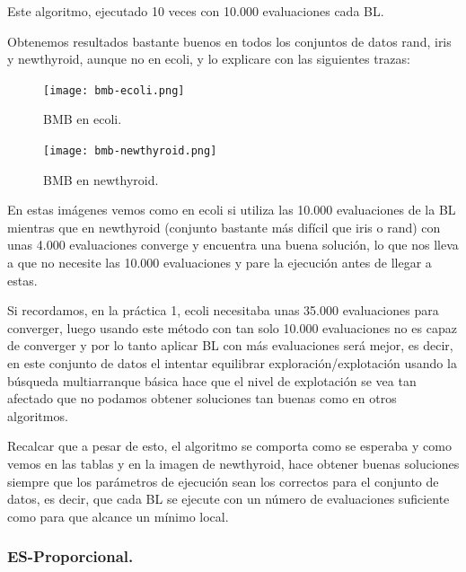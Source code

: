 \documentclass[12pt, spanish]{article}
\begin{document}
Este algoritmo, ejecutado 10 veces con 10.000 evaluaciones cada BL.

Obtenemos resultados bastante buenos en todos los conjuntos de datos rand, iris y newthyroid, aunque no en ecoli, y lo explicare con las siguientes trazas:

\begin{figure}[H]
	\centering
	\hspace*{-1.7cm}\texttt{[image: bmb-ecoli.png]}
	
	\caption{BMB en ecoli.}
	\label{fig:bmb-cmp1}
\end{figure}

\begin{figure}[H]
	\centering
	\hspace*{-1.7cm}\texttt{[image: bmb-newthyroid.png]}
	
	\caption{BMB en newthyroid.}
	\label{fig:bmb-cmp2}
\end{figure}


En estas imágenes vemos como en ecoli si utiliza las 10.000 evaluaciones de la BL mientras que en newthyroid (conjunto bastante más difícil que iris o rand) con unas 4.000 evaluaciones converge y encuentra una buena solución, lo que nos lleva a que no necesite las 10.000 evaluaciones y pare la ejecución antes de llegar a estas. 

Si recordamos, en la práctica 1, ecoli necesitaba unas 35.000 evaluaciones para converger, luego usando este método con tan solo 10.000 evaluaciones no es capaz de converger y por lo tanto aplicar BL con más evaluaciones será mejor, es decir, en este conjunto de datos el intentar equilibrar exploración/explotación usando la búsqueda multiarranque básica hace que el nivel de explotación se vea tan afectado que no podamos obtener soluciones tan buenas como en otros algoritmos.

Recalcar que a pesar de esto, el algoritmo se comporta como se esperaba y como vemos en las tablas y en la imagen de newthyroid, hace obtener buenas soluciones siempre que los parámetros de ejecución sean los correctos para el conjunto de datos, es decir, que cada BL se ejecute con un número de evaluaciones suficiente como para que alcance un mínimo local.

\subsubsection{ES-Proporcional.}
\end{document}
